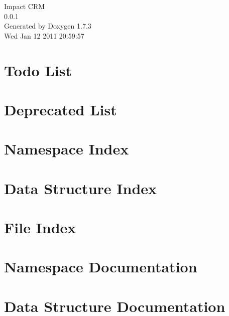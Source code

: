 \documentclass[a4paper]{book}
\begin{document}
\hypersetup{pageanchor=false}
\begin{titlepage}
\vspace*{7cm}
\begin{center}
{\Large Impact CRM \\[1ex]\large 0.0.1 }\\
\vspace*{1cm}
{\large Generated by Doxygen 1.7.3}\\
\vspace*{0.5cm}
{\small Wed Jan 12 2011 20:59:57}\\
\end{center}
\end{titlepage}
\clearemptydoublepage
{}
\tableofcontents
\clearemptydoublepage
{}
\hypersetup{pageanchor=true}
\chapter{Todo List}
\label{todo}
\hypertarget{todo}{}

\chapter{Deprecated List}
\label{deprecated}
\hypertarget{deprecated}{}

\chapter{Namespace Index}

\chapter{Data Structure Index}

\chapter{File Index}

\chapter{Namespace Documentation}




\chapter{Data Structure Documentation}












\end{document}
